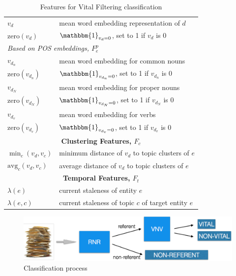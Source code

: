 \documentclass{article}
\begin{document}
\begin{table}[tb]
{\begin{tabular}{p{}p{}}
  $v_d$ & mean word embedding representation of $d$ \\
  $\text{zero}(v_d)$& $\mathbbm{1}_{v_d=0}$, set to 1 if $v_d$ is $0$ \\
\multicolumn{2}{l}{\emph{Based on POS embeddings, $F_e^p$}} \\ %
  $v_{d_n}$ & mean word embedding for common nouns\\ %
  $\text{zero}(v_{d_n})$& $\mathbbm{1}_{v_{d_n}=0}$, set to 1 if $v_{d_n}$ is $0$ \\
  $v_{d_N}$ & mean word embedding for proper nouns\\ %
  $\text{zero}(v_{d_N})$& $\mathbbm{1}_{v_{d_N}=0}$, set to 1 if $v_{d_N}$ is $0$ \\
  $v_{d_v}$ & mean word embedding for verbs \\ %
  $\text{zero}(v_{d_v})$& $\mathbbm{1}_{v_{d_v}=0}$, set to 1 if $v_{d_v}$ is $0$ \\
\midrule
\multicolumn{2}{c}{\textbf{Clustering Features, $F_c$}} \\ %
\midrule
  $\min_c(v_d,v_c)$& minimum distance of $v_d$ to topic clusters of $e$ \\
  $\text{avg}_c(v_d,v_c)$& average distance of $v_d$ to topic clusters of $e$ \\
\midrule
\multicolumn{2}{c}{\textbf{Temporal Features, $F_t$}} \\ %
\midrule
  $\lambda(e)$& current staleness of entity $e$ \\
  $\lambda(e,c)$& current staleness of topic $c$ of target entity $e$ \\
\bottomrule
\end{tabular}
} %
\caption{Features for Vital Filtering classification}
\label{features}
\end{table}



\begin{figure}[tb]
\centering
\includegraphics[width=1\columnwidth]{fig/classifier.pdf}
\caption{Classification process}
\label{classifier}
\end{figure}
\end{document}
